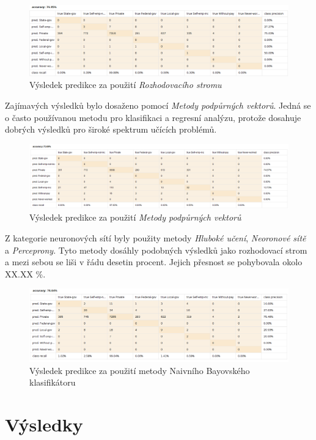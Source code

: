 \documentclass[11pt,a4paper,titlepage]{article}
\begin{document}
            \begin{figure}[H]
                \centering
                \includegraphics{./img/presnost_tree.png}
                \caption{Výsledek predikce za použití \textit{Rozhodovacího stromu}}
            \end{figure}

            Zajímavých výsledků bylo dosaženo pomocí \textit{Metody podpůrných vektorů}. Jedná se o často používanou metodu pro klasifikaci a regresní analýzu, protože dosahuje dobrých výsledků pro široké spektrum učících problémů.

            \begin{figure}[H]
                \centering
                \includegraphics{./img/presnost_svm.png}
                \caption{Výsledek predikce za použití \textit{Metody podpůrných vektorů}}
            \end{figure}

            Z kategorie neuronových sítí byly použity metody \textit{Hluboké učení}, \textit{Neoronové sítě} a \textit{Perceprony}. Tyto metody dosáhly podobných výsledků jako rozhodovací strom a mezi sebou se liši v řádu desetin procent. Jejich přesnost se pohybovala okolo XX.XX \%.

            \begin{figure}[H]
                \centering
                \includegraphics{./img/presnost_neural.png}
                \caption{Výsledek predikce za použití metody Naivního Bayovského klasifikátoru}
            \end{figure}

    \section{Výsledky}
        
        
    
\end{document}
